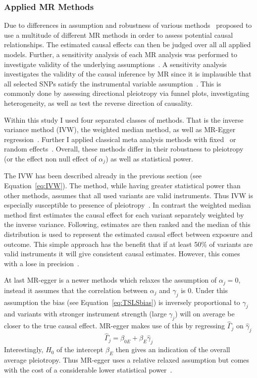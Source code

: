 \subsubsection{Applied MR Methods}
\label{ssub:Used_Metheds}

Due to differences in assumption and robustness of various methods~\citet{Burgess2016} proposed to use a multitude of different MR methods in order to assess potential causal relationships.
The estimated causal effects can then be judged over all all applied models.
Further, a sensitivity analysis of each MR analysis was performed to investigate validity of the underlying assumptions~\cite{Burgess2016}.
A sensitivity analysis investigates the validity of the causal inference by MR since it is implausible that all selected SNPs satisfy the instrumental variable assumption~\cite{Burgess2016}.
This is commonly done by assessing directional pleiotropy via funnel plots, investigating heterogeneity, as well as test the reverse direction of causality.

Within this study I used four separated classes of methods.
That is the inverse variance method (IVW), the weighted median method, as well as MR-Egger regression~\cite{Bowden2015}.
Further I applied classical meta analysis methods with fixed~\cite{Nelson2015a} or random effects~\cite{Ahmad2015a}.
Overall, these methods differ in their robustness to pleiotropy (or the effect non null effect of $\alpha_j$) as well as statistical power.

The IVW has been described already in the previous section (see Equation~\ref{eq:IVW}).
The method, while having greater statistical power than other methods, assumes that all used variants are valid instruments.
Thus IVW is especially susceptible to presence of pleiotropy~\cite{Burgess2015b}.
In contrast the weighted median method first estimates the causal effect for each variant separately weighted by the inverse variance. 
Following, estimates are then ranked and the median of this distribution is used to represent the estimated causal effect between exposure and outcome.
This simple approach has the benefit that if at least 50\% of variants are valid instruments it will give consistent causal estimates.
However, this comes with a lose in precision~\cite{Bowden2015}.

At last MR-egger is a newer methods which relaxes the assumption of $\alpha_j=0$, instead it assumes that the correlation between $\alpha_j$ and $\gamma_j$ is $0$.
Under this assumption the bias (see Equation~\ref{eq:TSLSbias}) is inversely proportional to $\gamma_j$ and variants with stronger instrument strength (large $\gamma_j$) will on average be closer to the true causal effect.
MR-egger makes use of this by regressing $\hat{\Gamma}_j$ on $\hat{\gamma}_j$
\begin{equation}\label{eq:egger}
  \hat{\Gamma}_j = \beta_{0E} + \beta_{E} \hat{\gamma}_j
\end{equation}
Interestingly, $H_0$ of the intercept $\beta_E$ then gives an indication of the overall average pleiotropy.
Thus MR-egger uses a relative relaxed assumption but comes with the cost of a considerable lower statistical power~\cite{Bowden2015}.

